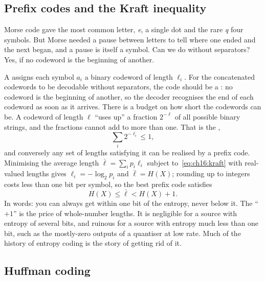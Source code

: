 \subsection{Prefix codes and the Kraft inequality}

Morse code gave the most common letter, \emph{e}, a single dot and the rare \emph{q} four
symbols. But Morse needed a pause between letters to tell where one ended and the next began,
and a pause is itself a symbol. Can we do without separators? Yes, if no codeword is the beginning
of another.

A  assigns each symbol $a_i$ a binary codeword of length $\ell_i$. For
the concatenated codewords to be decodable without separators, the code should be a : no codeword is the beginning of another, so the decoder recognises the end of each codeword
as soon as it arrives. There is a budget on how short the codewords can be. A codeword of length
$\ell$ ``uses up'' a fraction $2^{-\ell}$ of all possible binary strings, and the fractions cannot
add to more than one. That is the ,
\begin{equation}
\sum_i 2^{-\ell_i}\le1,
\label{eq:ch16:kraft}
\end{equation}
and conversely any set of lengths satisfying it can be realised by a prefix code. Minimising the
average length $\bar\ell=\sum_ip_i\ell_i$ subject to~\eqref{eq:ch16:kraft} with real-valued
lengths gives $\ell_i=-\log_2p_i$ and $\bar\ell=H(X)$; rounding up to integers costs less than one
bit per symbol, so the best prefix code satisfies
\begin{equation}
H(X)\le\bar\ell<H(X)+1.
\label{eq:ch16:prefixbound}
\end{equation}
In words: you can always get within one bit of the entropy, never below it. The ``$+1$'' is the
price of whole-number lengths. It is negligible for a source with entropy of several bits, and
ruinous for a source with entropy much less than one bit, such as the mostly-zero outputs of a
quantiser at low rate. Much of the history of entropy coding is the story of getting rid of it.

\subsection{Huffman coding}


